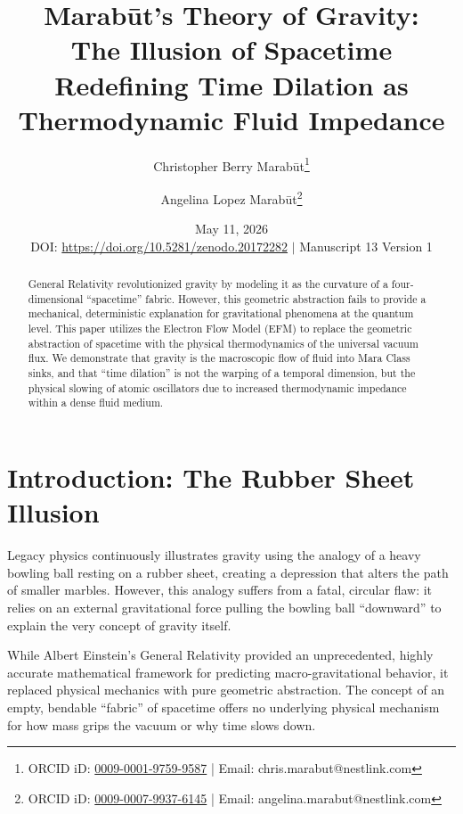 \documentclass[11pt, a4paper, table]{article}
\title{\textbf{Marab\={u}t's Theory of Gravity: \\ The Illusion of Spacetime} \\[1em] \large{Redefining Time Dilation as Thermodynamic Fluid Impedance}}
\author[1]{Christopher Berry Marab\={u}t\thanks{ORCID iD: \href{https://orcid.org/0009-0001-9759-9587}{0009-0001-9759-9587} | Email: chris.marabut@nestlink.com}}
\author[1]{Angelina Lopez Marab\={u}t\thanks{ORCID iD: \href{https://orcid.org/0009-0007-9937-6145}{0009-0007-9937-6145} | Email: angelina.marabut@nestlink.com}}
\affil[1]{Independent Researchers}
\date{May 11, 2026 \\[1.5em] \small{DOI: \url{https://doi.org/10.5281/zenodo.20172282} $|$ Manuscript 13 Version 1}}
\begin{document}

\maketitle

\begin{abstract}
  General Relativity revolutionized gravity by modeling it as the curvature of a four-dimensional ``spacetime'' fabric. However, this geometric abstraction fails to provide a mechanical, deterministic explanation for gravitational phenomena at the quantum level. This paper utilizes the Electron Flow Model (EFM) to replace the geometric abstraction of spacetime with the physical thermodynamics of the universal vacuum flux. We demonstrate that gravity is the macroscopic flow of fluid into Mara Class sinks, and that ``time dilation'' is not the warping of a temporal dimension, but the physical slowing of atomic oscillators due to increased thermodynamic impedance within a dense fluid medium.
\end{abstract}

\section{Introduction: The Rubber Sheet Illusion}
  Legacy physics continuously illustrates gravity using the analogy of a heavy bowling ball resting on a rubber sheet, creating a depression that alters the path of smaller marbles. However, this analogy suffers from a fatal, circular flaw: it relies on an external gravitational force pulling the bowling ball ``downward'' to explain the very concept of gravity itself. 

  While Albert Einstein's General Relativity provided an unprecedented, highly accurate mathematical framework for predicting macro-gravitational behavior, it replaced physical mechanics with pure geometric abstraction. The concept of an empty, bendable ``fabric'' of spacetime offers no underlying physical mechanism for how mass grips the vacuum or why time slows down.
\end{document}
